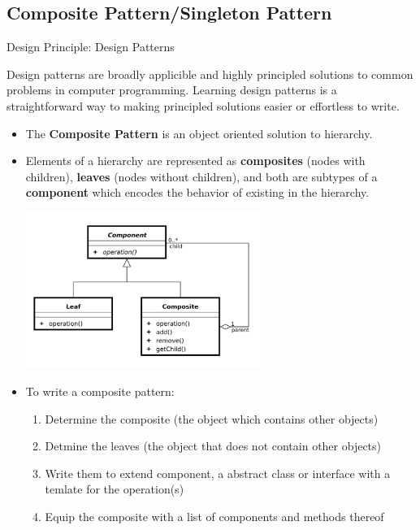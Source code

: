 \documentclass[letterpaper] {article}
\begin{document}
    \subsection{Composite Pattern/Singleton Pattern}
    \begin{framed}
        \begin{center}
            Design Principle: Design Patterns
        \end{center}
        Design patterns are broadly applicible and highly principled solutions to common problems in computer programming. Learning design patterns is a straightforward way to making principled solutions easier or effortless to write. 
    \end{framed}
    \begin{itemize}
        \item The \textbf{Composite Pattern} is an object oriented solution to hierarchy. 
        \item Elements of a hierarchy are represented as \textbf{composites} (nodes with children), \textbf{leaves} (nodes without children), and both are subtypes of a \textbf{component} which encodes the behavior of existing in the hierarchy. 
        \begin{center}
            \includegraphics[width=3in]{composite} 
        \end{center}
        \item To write a composite pattern:
            \begin{enumerate}
                \item Determine the composite (the object which contains other objects)
                \item Detmine the leaves (the object that does not contain other objects)
                \item Write them to extend component, a abstract class or interface with a temlate for the operation(s)
                \item Equip the composite with a list of components and methods thereof

\end{enumerate}
\end{itemize}
\end{document}
